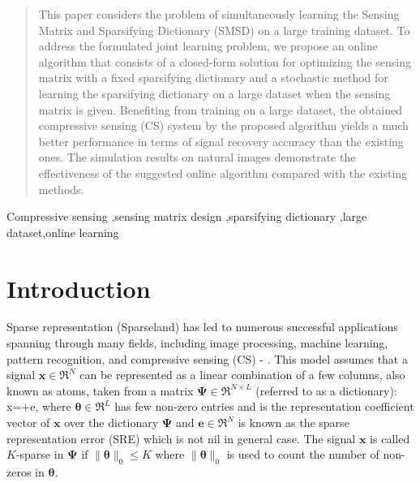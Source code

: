\documentclass[final,5p,times,twocolumn]{elsarticle}
\begin{document}
\begin{frontmatter}
\begin{abstract}
This paper considers the problem of simultaneously learning the Sensing Matrix and Sparsifying Dictionary (SMSD)  on a large training dataset. To address the formulated joint learning problem, we propose an online algorithm that consists of a closed-form solution for optimizing the sensing matrix with a fixed sparsifying dictionary and a stochastic method for learning the sparsifying dictionary on a large dataset when the sensing matrix is given. Benefiting from training on a large dataset, the obtained compressive sensing (CS) system by the proposed algorithm yields a much better performance in terms of signal recovery accuracy than the existing ones. The simulation results on natural images demonstrate the effectiveness of the suggested online algorithm compared with the existing methods.
\end{abstract}

\begin{keyword}
Compressive sensing \sep sensing matrix design \sep sparsifying dictionary \sep large dataset\sep online learning


\end{keyword}


\end{frontmatter}

\section{Introduction}\label{S_1}
Sparse representation (Sparseland) has led to numerous successful applications spanning through many fields, including image processing, machine learning, pattern recognition, and compressive sensing (CS) \cite{M08} - \cite{CW08}. This model assumes that a signal $\bm x\in \Re^{N}$ can be represented as a linear combination of a few columns, also known as atoms, taken from a matrix $\bm\Psi\in\Re^{N\times L}$ (referred to as a dictionary):
\e
\bm x=\bm\Psi\bm \theta+\bm e,\label{sparse_representation}
\ee
where $\bm\theta\in\Re^{L}$ has few non-zero entries and is the representation coefficient vector of $\bm x$ over the dictionary $\bm \Psi$ and $\bm e\in\Re^N$ is known as the sparse representation error (SRE) which is not nil in general case. The signal $\bm x$ is called  $K$-sparse in $\bm\Psi$ if $\|\bm\theta\|_0\leq K$ where $\|\bm\theta\|_0$ is used to count the number of non-zeros in $\bm\theta$.%
\end{document}
